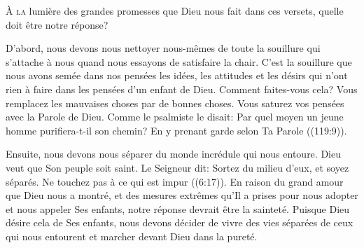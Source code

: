 \dvrule







\lettrine{À}{ la} lumière des grandes promesses que Dieu nous fait
 dans ces versets, quelle doit être notre réponse? 

D'abord, nous devons nous nettoyer nous-mêmes de toute la souillure
 qui s'attache à nous quand nous essayons de satisfaire la chair.
 C'est la souillure que nous avons semée dans nos pensées
 \ocadr les idées, les attitudes et les désirs qui n'ont rien à faire
 dans les pensées d'un enfant de Dieu. Comment faites-vous cela?
 Vous remplacez les mauvaises choses par de bonnes choses.
 Vous saturez vos pensées avec la Parole de Dieu.
 Comme le psalmiste le disait: 
 \Og Par quel moyen un jeune homme purifiera-t-il son chemin?
 En y prenant garde selon Ta Parole \Fg{} ((119:9)).


Ensuite, nous devons nous séparer du monde incrédule qui nous entoure.
 Dieu veut que Son peuple soit saint. Le Seigneur dit: 
 \Og Sortez du milieu d’eux, et soyez séparés.
 Ne touchez pas à ce qui est impur \Fg{} ((6:17)).
 En raison du grand amour que Dieu nous a montré,
 et des mesures extrêmes qu'Il a prises pour nous adopter
 et nous appeler Ses enfants, notre réponse devrait être la sainteté.
 Puisque Dieu désire cela de Ses enfants, nous devons décider de vivre
 des vies séparées de ceux qui nous entourent et marcher devant Dieu dans la pureté.

